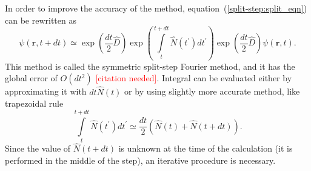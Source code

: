 \documentclass[12pt,notitlepage]{report}
\begin{document}
In order to improve the accuracy of the method, equation~(\ref{split-step:split_eqn}) can be rewritten as
\[
\psi(\mathbf{r}, t + dt) \simeq \exp \left( \frac{dt}{2} \hat{D} \right)
\exp \left( \int\limits^{t + dt}_t \hat{N} (t^\prime) dt^\prime \right)
\exp \left( \frac{dt}{2} \hat{D} \right) \psi(\mathbf{r}, t).
\]
This method is called the symmetric split-step Fourier method, and it has the global error of $O(dt^2)$
\textcolor{red}{[citation needed]}.
Integral can be evaluated either by approximating it with $dt \hat{N}(t)$ or by using slightly more accurate method,
like trapezoidal rule
\[
\int\limits^{t + dt}_t \hat{N} (t^\prime) dt^\prime \simeq
\frac{dt}{2} \left( \hat{N}(t) + \hat{N}(t + dt) \right).
\]
Since the value of $\hat{N}(t + dt)$ is unknown at the time of the calculation
(it is performed in the middle of the step), an iterative procedure is necessary.



\end{document}
